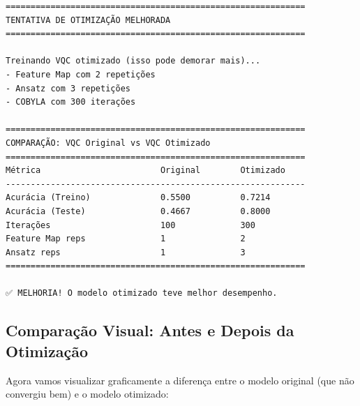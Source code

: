 \documentclass[
  brazilian,
]{report}
\begin{document}
\begin{verbatim}
============================================================
TENTATIVA DE OTIMIZAÇÃO MELHORADA
============================================================

Treinando VQC otimizado (isso pode demorar mais)...
- Feature Map com 2 repetições
- Ansatz com 3 repetições
- COBYLA com 300 iterações

============================================================
COMPARAÇÃO: VQC Original vs VQC Otimizado
============================================================
Métrica                        Original        Otimizado      
------------------------------------------------------------
Acurácia (Treino)              0.5500          0.7214         
Acurácia (Teste)               0.4667          0.8000         
Iterações                      100             300            
Feature Map reps               1               2              
Ansatz reps                    1               3              
============================================================

✅ MELHORIA! O modelo otimizado teve melhor desempenho.
\end{verbatim}

\subsection{Comparação Visual: Antes e Depois da
Otimização}\label{comparauxe7uxe3o-visual-antes-e-depois-da-otimizauxe7uxe3o}

Agora vamos visualizar graficamente a diferença entre o modelo original
(que não convergiu bem) e o modelo otimizado:
\end{document}
